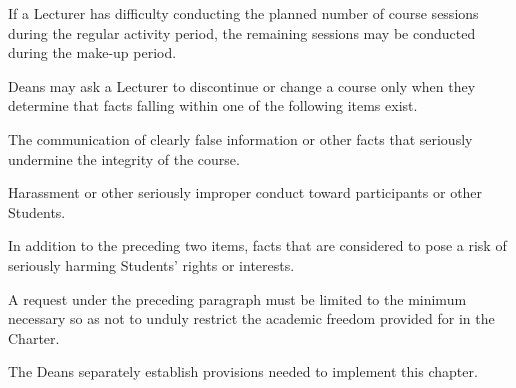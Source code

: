 \begin{articles}
\begin{paragraphs}
  \end{paragraphs}
  \item If a Lecturer has difficulty conducting the planned number of course sessions during the regular activity period, the remaining sessions may be conducted during the make-up period.
  \item Deans may ask a Lecturer to discontinue or change a course only when they determine that facts falling within one of the following items exist.
  \begin{subitems}
    \item The communication of clearly false information or other facts that seriously undermine the integrity of the course.
    \item Harassment or other seriously improper conduct toward participants or other Students.
    \item In addition to the preceding two items, facts that are considered to pose a risk of seriously harming Students' rights or interests.
  \end{subitems}
  \begin{paragraphs}
    \item A request under the preceding paragraph must be limited to the minimum necessary so as not to unduly restrict the academic freedom provided for in the Charter.
  \end{paragraphs}
  \item The Deans separately establish provisions needed to implement this chapter.
\end{articles}
